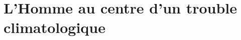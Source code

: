 








\section{L’Homme au centre d’un trouble climatologique} %
\label{sec:l_homme_au_centre_d_un_trouble_climatologique}
